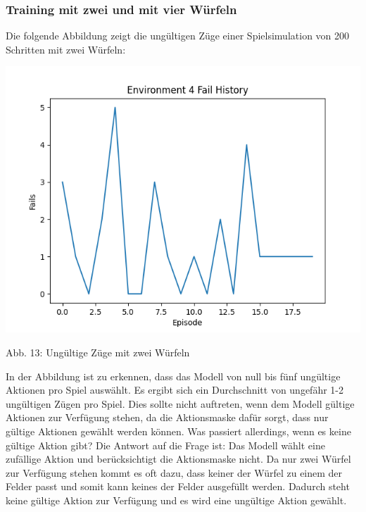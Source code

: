 \subsubsection{Training mit zwei und mit vier Würfeln}
\begin{minipage}{\linewidth}
Die folgende Abbildung zeigt die ungültigen Züge einer Spielsimulation von 200 Schritten mit zwei Würfeln:

	\vspace{0.5cm}
	\includegraphics[width=1\textwidth]{Bilder/failswithtwodice}
	
	Abb. 13: Ungültige Züge mit zwei Würfeln\\
\end{minipage}

In der Abbildung ist zu erkennen, dass das Modell von null bis fünf ungültige Aktionen pro Spiel auswählt. Es ergibt sich ein Durchschnitt von ungefähr 1-2 ungültigen Zügen pro Spiel. Dies sollte nicht auftreten, wenn dem Modell gültige Aktionen zur Verfügung stehen, da die Aktionsmaske dafür sorgt, dass nur gültige Aktionen gewählt werden können. Was passiert allerdings, wenn es keine gültige Aktion gibt? Die Antwort auf die Frage ist: Das Modell wählt eine zufällige Aktion und berücksichtigt die Aktionsmaske nicht. Da nur zwei Würfel zur Verfügung stehen kommt es oft dazu, dass keiner der Würfel zu einem der Felder passt und somit kann keines der Felder ausgefüllt werden. Dadurch steht keine gültige Aktion zur Verfügung und es wird eine ungültige Aktion gewählt.


